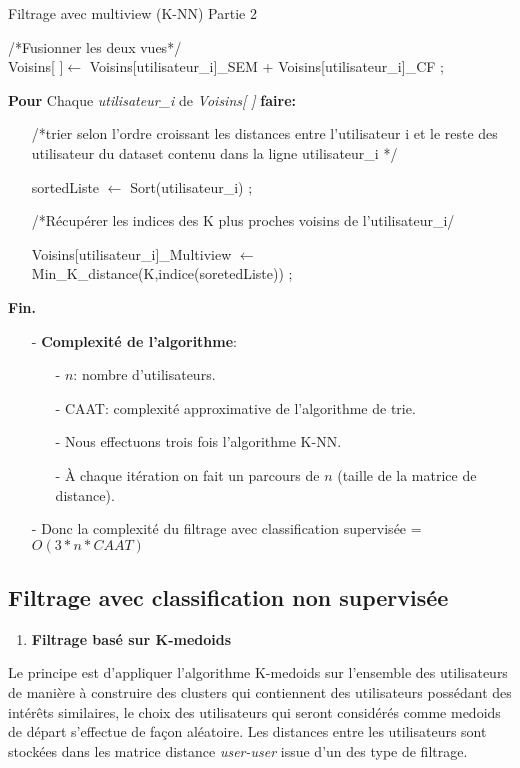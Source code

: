 \setcounter{algorithm}{5}
\begin{algorithm}[H]
\caption{Filtrage avec multiview (K-NN) Partie 2}
/*Fusionner les deux vues*/
\hspace*{\algorithmicindent} \\Voisins[ ]$\leftarrow$ Voisins[utilisateur{\_}i]{\_}SEM + Voisins[utilisateur{\_}i]{\_}CF ;

\textbf{Pour} Chaque \textit{utilisateur{\_}i} de \textit{ Voisins[ ]} \textbf{faire:} 

\begin{itemize}
	\item [] /*trier selon l'ordre croissant les distances entre l'utilisateur i et le reste des utilisateur du dataset contenu dans la ligne utilisateur{\_}i */
	\item []	sortedListe $\leftarrow$ Sort(utilisateur{\_}i) ;
	\item []	/*Récupérer les indices des K plus proches voisins de l'utilisateur{\_}i/
	\item [] Voisins[utilisateur{\_}i]{\_}Multiview $\leftarrow$ Min{\_}K{\_}distance(K,indice(soretedListe)) ;
	
\end{itemize}

\textbf{ Fin.}
\end{algorithm} 
\begin{itemize}
	\item [-] \textbf{Complexité de l'algorithme}:
	\begin{itemize}
		\item [-] $n$: nombre d'utilisateurs.
		\item [-] CAAT: complexité approximative de l'algorithme de trie.
		\item [-] Nous effectuons trois fois l'algorithme K-NN.
		\item [-] À chaque itération on fait un parcours de $n$ (taille de la matrice de distance).
	\end{itemize}
	\item [-]  Donc la complexité du filtrage avec classification supervisée = $O(3*n*CAAT)$
\end{itemize}


\subsection{Filtrage avec classification non supervisée}
\begin{enumerate}[nosep,label=\textbf{\arabic*)}]
	\item \textbf{Filtrage basé sur K-medoids}
\end{enumerate}\mbox{}\indent Le principe est d'appliquer l'algorithme K-medoids sur l'ensemble des utilisateurs de manière à construire des clusters qui contiennent des utilisateurs possédant des intérêts similaires, le choix des utilisateurs qui seront considérés comme medoids de départ s'effectue de façon aléatoire.
Les distances entre les utilisateurs sont stockées dans les matrice distance \textit{user-user} issue d'un des type de filtrage.

